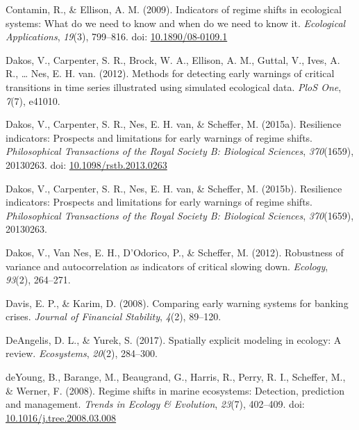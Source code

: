 \documentclass[12pt,twoside,openany]{reedthesis}
\begin{document}
\leavevmode\hypertarget{ref-contamin_indicators_2009}{}%
Contamin, R., \& Ellison, A. M. (2009). Indicators of regime shifts in ecological systems: What do we need to know and when do we need to know it. \emph{Ecological Applications}, \emph{19}(3), 799--816. doi: \href{https://doi.org/10.1890/08-0109.1}{10.1890/08-0109.1}

\leavevmode\hypertarget{ref-dakos_methods_2012}{}%
Dakos, V., Carpenter, S. R., Brock, W. A., Ellison, A. M., Guttal, V., Ives, A. R., \ldots{} Nes, E. H. van. (2012). Methods for detecting early warnings of critical transitions in time series illustrated using simulated ecological data. \emph{PloS One}, \emph{7}(7), e41010.

\leavevmode\hypertarget{ref-dakos_resilience_2015}{}%
Dakos, V., Carpenter, S. R., Nes, E. H. van, \& Scheffer, M. (2015a). Resilience indicators: Prospects and limitations for early warnings of regime shifts. \emph{Philosophical Transactions of the Royal Society B: Biological Sciences}, \emph{370}(1659), 20130263. doi: \href{https://doi.org/10.1098/rstb.2013.0263}{10.1098/rstb.2013.0263}

\leavevmode\hypertarget{ref-dakos2015resilience}{}%
Dakos, V., Carpenter, S. R., Nes, E. H. van, \& Scheffer, M. (2015b). Resilience indicators: Prospects and limitations for early warnings of regime shifts. \emph{Philosophical Transactions of the Royal Society B: Biological Sciences}, \emph{370}(1659), 20130263.

\leavevmode\hypertarget{ref-dakos2012robustness}{}%
Dakos, V., Van Nes, E. H., D'Odorico, P., \& Scheffer, M. (2012). Robustness of variance and autocorrelation as indicators of critical slowing down. \emph{Ecology}, \emph{93}(2), 264--271.

\leavevmode\hypertarget{ref-davis_comparing_2008}{}%
Davis, E. P., \& Karim, D. (2008). Comparing early warning systems for banking crises. \emph{Journal of Financial Stability}, \emph{4}(2), 89--120.

\leavevmode\hypertarget{ref-deangelis2017spatially}{}%
DeAngelis, D. L., \& Yurek, S. (2017). Spatially explicit modeling in ecology: A review. \emph{Ecosystems}, \emph{20}(2), 284--300.

\leavevmode\hypertarget{ref-deyoung_regime_2008}{}%
deYoung, B., Barange, M., Beaugrand, G., Harris, R., Perry, R. I., Scheffer, M., \& Werner, F. (2008). Regime shifts in marine ecosystems: Detection, prediction and management. \emph{Trends in Ecology \& Evolution}, \emph{23}(7), 402--409. doi: \href{https://doi.org/10.1016/j.tree.2008.03.008}{10.1016/j.tree.2008.03.008}
\end{document}
